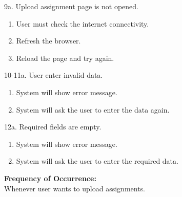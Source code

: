 \documentclass[12pt]{article}
\begin{document}
9a. Upload assignment page is not opened.
\begin{enumerate}
\item User must check the internet connectivity.
\item Refresh the browser.
\item Reload the page and try again.
\end{enumerate}
10-11a. User enter invalid data.
\begin{enumerate}
\item System will show error message.
\item System will ask the user to enter the data again.
\end{enumerate}
12a. Required fields are empty.
\begin{enumerate}
\item System will show error message.
\item System will ask the user to enter the required data. 
\end{enumerate}
\textbf{Frequency of Occurrence:}\\
Whenever user wants to upload assignments.
\end{document}
